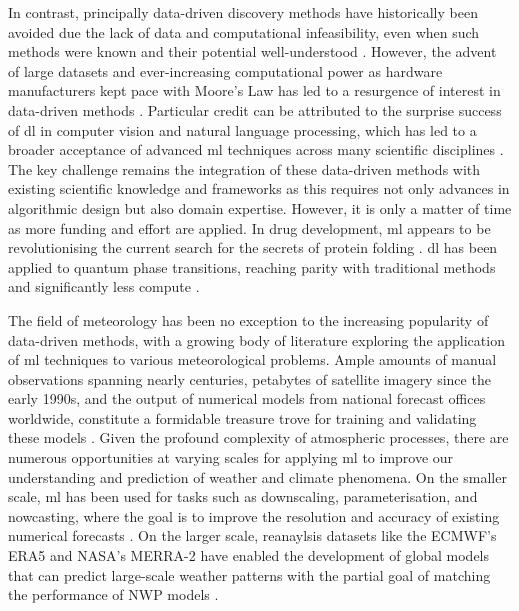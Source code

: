 In contrast, principally data-driven discovery methods have historically been avoided due the lack of data and computational infeasibility, even when such methods were known and their potential well-understood . However, the advent of large datasets and ever-increasing computational power as hardware manufacturers kept pace with Moore's Law  has led to a resurgence of interest in data-driven methods . Particular credit can be attributed to the surprise success of \acrfull{dl} in computer vision and natural language processing, which has led to a broader acceptance of advanced \acrfull{ml} techniques across many scientific disciplines . The key challenge remains the integration of these data-driven methods with existing scientific knowledge and frameworks as this requires not only advances in algorithmic design but also domain expertise. However, it is only a matter of time as more funding and effort are applied. In drug development, \acrfull{ml} appears to be revolutionising the current search for the secrets of protein folding . \acrshort{dl} has been applied to quantum phase transitions, reaching parity with traditional methods and significantly less compute .

The field of meteorology has been no exception to the increasing popularity of data-driven methods, with a growing body of literature exploring the application of \acrshort{ml} techniques to various meteorological problems. Ample amounts of manual observations spanning nearly centuries, petabytes of satellite imagery since the early 1990s, and the output of numerical models from national forecast offices worldwide, constitute a formidable treasure trove for training and validating these models \citep{Waqas2024}. Given the profound complexity of atmospheric processes, there are numerous opportunities at varying scales for applying \acrshort{ml} to improve our understanding and prediction of weather and climate phenomena. On the smaller scale, \acrshort{ml} has been used for tasks such as downscaling, parameterisation, and nowcasting, where the goal is to improve the resolution and accuracy of existing numerical forecasts . On the larger scale, reanaylsis datasets like the ECMWF's ERA5 and NASA's MERRA-2 have enabled the development of global models that can predict large-scale weather patterns with the partial goal of matching the performance of NWP models .

